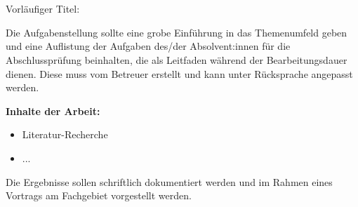 \chapter*{\LangTask}
Vorläufiger Titel: \textbf{\ThesisTitle}

Die Aufgabenstellung sollte eine grobe Einführung in das Themenumfeld geben und eine Auflistung der Aufgaben des/der Absolvent:innen für die Abschlussprüfung beinhalten, die als Leitfaden während der Bearbeitungsdauer dienen. Diese muss vom Betreuer erstellt und kann unter Rücksprache angepasst werden.

\textbf{Inhalte der Arbeit:}
\begin{itemize}
    \setlength{\itemsep}{-2pt} 
    \item Literatur-Recherche
    \item ...  
\end{itemize}
Die Ergebnisse sollen schriftlich dokumentiert werden und im Rahmen eines Vortrags am Fachgebiet vorgestellt werden.
